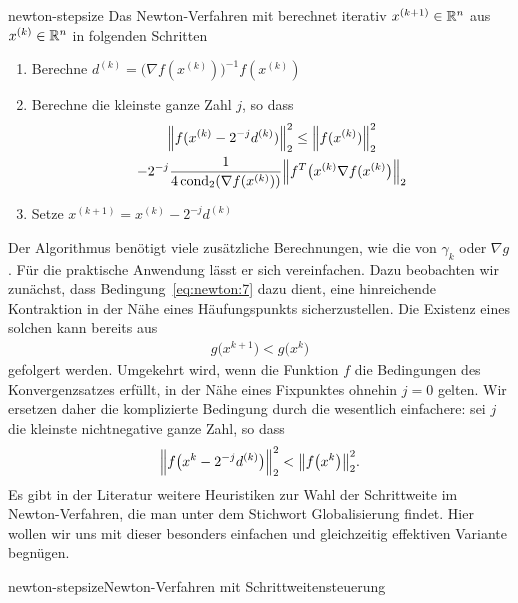\begin{Definition}{newton-stepsize}
  Das Newton-Verfahren mit  berechnet iterativ
  $x^{(k+1)}\in \mathbb R^n$ aus $x^{(k)}\in \mathbb R^n$ in folgenden Schritten
  \begin{enumerate}
  \item Berechne $d^{(k)} = \bigl(\nabla f(x^{(k)})\bigr)^{-1}f(x^{(k)})$
  \item Berechne die kleinste ganze Zahl $j$, so dass
    \begin{multline}
      \norm*{f(x^{(k)}-2^{-j} d^{(k)})}_2^2
      \le \norm*{f(x^{(k)})}_2^2
      \\- 2^{-j} \frac{1}{4\cond_2(\nabla f(x^{(k)}))}
      \norm*{f^T\bigl(x^{(k)}\nabla f(x^{(k)}\bigr)}_2
    \end{multline}
    \item Setze $x^{(k+1)}=x^{(k)}-2^{-j} d^{(k)}$
  \end{enumerate}
\end{Definition}

\begin{remark}
  Der Algorithmus benötigt viele zusätzliche Berechnungen, wie die von
  $\gamma_k$ oder $\nabla g$. Für die praktische Anwendung lässt er
  sich vereinfachen. Dazu beobachten wir zunächst, dass
  Bedingung~\eqref{eq:newton:7} dazu dient, eine hinreichende
  Kontraktion in der Nähe eines Häufungspunkts sicherzustellen. Die
  Existenz eines solchen kann bereits aus
  \begin{gather}
    g\bigl(x^{k+1}\bigr) < g\bigl(x^{k}\bigr)
  \end{gather}
  gefolgert werden. Umgekehrt wird, wenn die Funktion $f$ die
  Bedingungen des Konvergenzsatzes 
  erfüllt, in der Nähe eines Fixpunktes ohnehin $j=0$ gelten. Wir
  ersetzen daher die komplizierte Bedingung durch die wesentlich
  einfachere: sei $j$ die kleinste nichtnegative ganze Zahl, so dass
  \begin{gather}
    \norm*{f\bigl(x^{k} - 2^{-j} d^{(k)}\bigr)}_2^2 < \norm*{f\bigl(x^{k}\bigr)}_2^2.
  \end{gather}
  Es gibt in der Literatur weitere Heuristiken zur Wahl der
  Schrittweite im Newton-Verfahren, die man unter dem Stichwort \glqq
  Globalisierung\grqq{} findet. Hier wollen wir uns mit dieser
  besonders einfachen und gleichzeitig effektiven Variante begnügen.
\end{remark}

\begin{Algorithmus*}{newton-stepsize}{Newton-Verfahren mit Schrittweitensteuerung}
  
\end{Algorithmus*}

